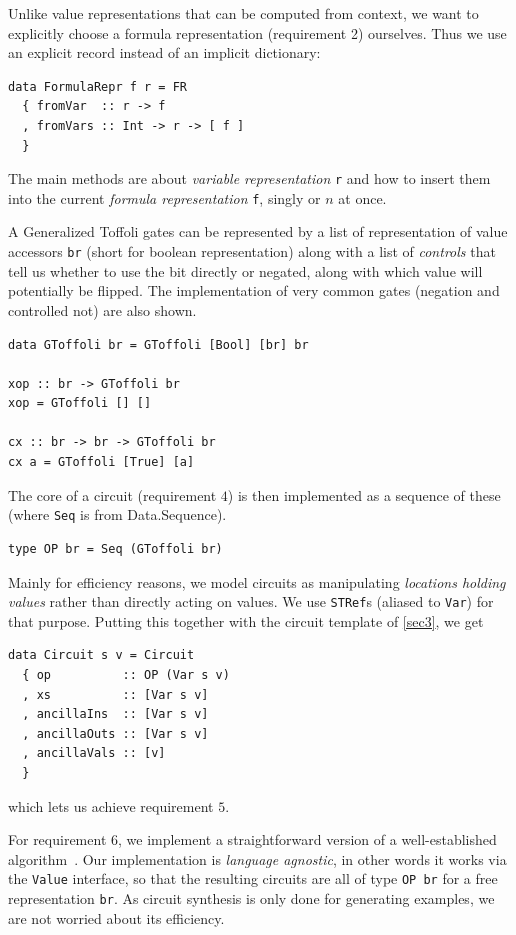 \documentclass[sigplan,screen]{acmart}
\theoremstyle{definition}
\begin{document}
Unlike value representations that can be computed from context, we
want to explicitly choose a formula representation (requirement 2)
ourselves. Thus we use an explicit record instead of an implicit
dictionary:

\begin{verbatim}
data FormulaRepr f r = FR
  { fromVar  :: r -> f
  , fromVars :: Int -> r -> [ f ]
  }
\end{verbatim}
\noindent The main methods are about \emph{variable representation} \texttt{r}
and how to insert them into the current \emph{formula representation} \texttt{f},
singly or $n$ at once.

A Generalized Toffoli gates can be represented by a list of representation of
value accessors \texttt{br} (short for boolean representation) along with a list
of \emph{controls} that tell us whether to use the bit directly or negated,
along with which value will potentially be flipped. The implementation of very
common gates (negation and controlled not) are also shown.
\begin{verbatim}
data GToffoli br = GToffoli [Bool] [br] br

xop :: br -> GToffoli br
xop = GToffoli [] []

cx :: br -> br -> GToffoli br
cx a = GToffoli [True] [a]
\end{verbatim}
\noindent The core of a circuit (requirement $4$) is then implemented as a
sequence of these (where \texttt{Seq} is from {Data.Sequence}).
\begin{verbatim}
type OP br = Seq (GToffoli br)
\end{verbatim}

\noindent Mainly for efficiency reasons, we model circuits as manipulating
\emph{locations holding values} rather than directly acting on values. We
use \texttt{STRef}s (aliased to \texttt{Var}) for that purpose. Putting this
together with the circuit template of \ref{sec3}, we get
\begin{verbatim}
data Circuit s v = Circuit
  { op          :: OP (Var s v)
  , xs          :: [Var s v]
  , ancillaIns  :: [Var s v]
  , ancillaOuts :: [Var s v]
  , ancillaVals :: [v]
  }
\end{verbatim}
\noindent which lets us achieve requirement $5$.

For requirement $6$, we implement a straightforward version of a
well-established algorithm~\cite{soeken2016fast}. Our implementation
is \emph{language agnostic}, in other words it works via the
\texttt{Value} interface, so that the resulting circuits are all of
type \texttt{OP br} for a free representation \texttt{br}. As circuit
synthesis is only done for generating examples, we are not worried
about its efficiency.
\end{document}

